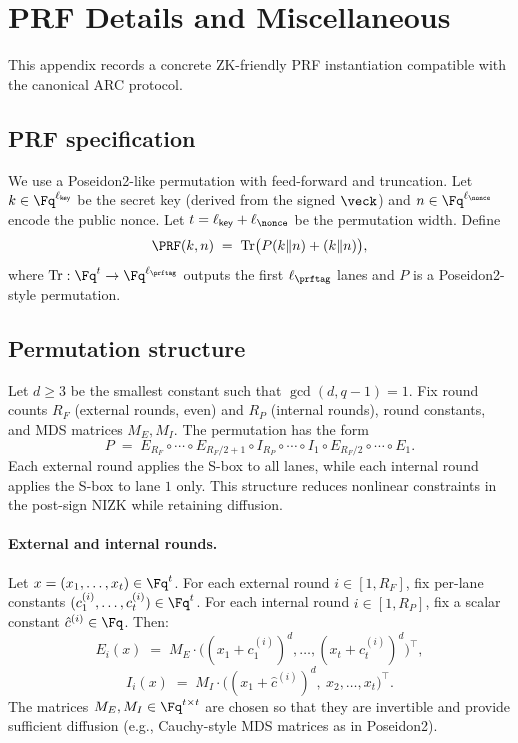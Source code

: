 \section{PRF Details and Miscellaneous}
\label{app:prf}

This appendix records a concrete ZK-friendly PRF instantiation compatible with the canonical ARC protocol.

\subsection{PRF specification}
We use a Poseidon2-like permutation with feed-forward and truncation. Let \(k\in\Fq^{\ell_{\mathsf{key}}}\) be the secret
key (derived from the signed \(\veck\)) and \(n\in\Fq^{\ell_{\nonce}}\) encode the public nonce. Let
\(t=\ell_{\mathsf{key}}+\ell_{\nonce}\) be the permutation width. Define
\[
  \PRF(k,n) \;=\; \mathrm{Tr}\big(P(k\Vert n) + (k\Vert n)\big),
\]
where \(\mathrm{Tr}:\Fq^{t}\to \Fq^{\ell_{\prftag}}\) outputs the first \(\ell_{\prftag}\) lanes and \(P\) is a
Poseidon2-style permutation.

\subsection{Permutation structure}
Let \(d\ge 3\) be the smallest constant such that \(\gcd(d,q-1)=1\). Fix round counts \(R_F\) (external rounds, even) and
\(R_P\) (internal rounds), round constants, and MDS matrices \(M_E,M_I\). The permutation has the form
\[
  P \;=\; E_{R_F}\circ\cdots\circ E_{R_F/2+1}\circ I_{R_P}\circ\cdots\circ I_{1}\circ E_{R_F/2}\circ\cdots\circ E_1.
\]
Each external round applies the S-box to all lanes, while each internal round applies the S-box to lane \(1\) only.
This structure reduces nonlinear constraints in the post-sign NIZK while retaining diffusion.

\paragraph{External and internal rounds.}
Let \(x=(x_1,\dots,x_t)\in\Fq^t\). For each external round \(i\in[1,R_F]\), fix per-lane constants
\((c^{(i)}_1,\dots,c^{(i)}_t)\in\Fq^t\). For each internal round \(i\in[1,R_P]\), fix a scalar constant \(\hat c^{(i)}\in\Fq\).
Then:
\[
  E_i(x) \;=\; M_E\cdot \bigl((x_1+c^{(i)}_1)^d,\dots,(x_t+c^{(i)}_t)^d\bigr)^\top,
\]
\[
  I_i(x) \;=\; M_I\cdot \bigl((x_1+\hat c^{(i)})^d,\ x_2,\dots,x_t\bigr)^\top.
\]
The matrices \(M_E,M_I\in\Fq^{t\times t}\) are chosen so that they are invertible and provide sufficient diffusion (e.g.,
Cauchy-style MDS matrices as in Poseidon2).


